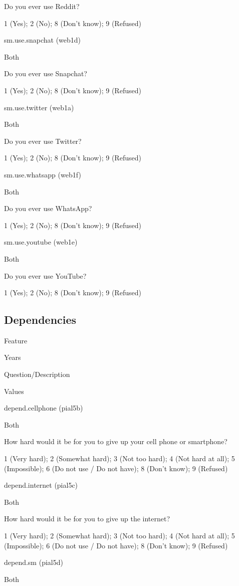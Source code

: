 \documentclass[]{book}
\begin{document}
Do you ever use Reddit?

1 (Yes); 2 (No); 8 (Don't know); 9 (Refused)

sm.use.snapchat (web1d)

Both

Do you ever use Snapchat?

1 (Yes); 2 (No); 8 (Don't know); 9 (Refused)

sm.use.twitter (web1a)

Both

Do you ever use Twitter?

1 (Yes); 2 (No); 8 (Don't know); 9 (Refused)

sm.use.whatsapp (web1f)

Both

Do you ever use WhatsApp?

1 (Yes); 2 (No); 8 (Don't know); 9 (Refused)

sm.use.youtube (web1e)

Both

Do you ever use YouTube?

1 (Yes); 2 (No); 8 (Don't know); 9 (Refused)

\subsection*{Dependencies}\label{dependencies}

Feature

Years

Question/Description

Values

depend.cellphone (pial5b)

Both

How hard would it be for you to give up your cell phone or smartphone?

1 (Very hard); 2 (Somewhat hard); 3 (Not too hard); 4 (Not hard at all);
5 (Impossible); 6 (Do not use / Do not have); 8 (Don't know); 9
(Refused)

depend.internet (pial5c)

Both

How hard would it be for you to give up the internet?

1 (Very hard); 2 (Somewhat hard); 3 (Not too hard); 4 (Not hard at all);
5 (Impossible); 6 (Do not use / Do not have); 8 (Don't know); 9
(Refused)

depend.sm (pial5d)

Both
\end{document}
